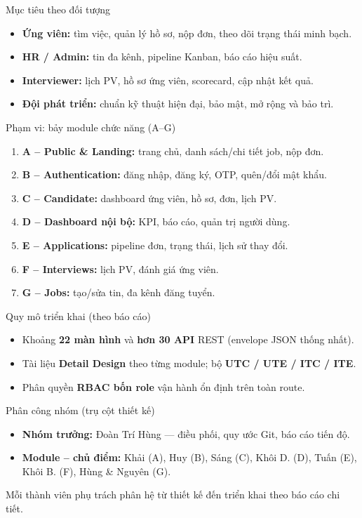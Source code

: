 \begin{frame}{Mục tiêu theo đối tượng}
  \small
  \begin{itemize}
    \item \textbf{Ứng viên:} tìm việc, quản lý hồ sơ, nộp đơn, theo dõi trạng thái minh bạch.
    \item \textbf{HR / Admin:} tin đa kênh, pipeline Kanban, báo cáo hiệu suất.
    \item \textbf{Interviewer:} lịch PV, hồ sơ ứng viên, scorecard, cập nhật kết quả.
    \item \textbf{Đội phát triển:} chuẩn kỹ thuật hiện đại, bảo mật, mở rộng và bảo trì.
  \end{itemize}
\end{frame}

\begin{frame}{Phạm vi: bảy module chức năng (A--G)}
  \footnotesize
  \begin{enumerate}
    \item \textbf{A -- Public \& Landing:} trang chủ, danh sách/chi tiết job, nộp đơn.
    \item \textbf{B -- Authentication:} đăng nhập, đăng ký, OTP, quên/đổi mật khẩu.
    \item \textbf{C -- Candidate:} dashboard ứng viên, hồ sơ, đơn, lịch PV.
    \item \textbf{D -- Dashboard nội bộ:} KPI, báo cáo, quản trị người dùng.
    \item \textbf{E -- Applications:} pipeline đơn, trạng thái, lịch sử thay đổi.
    \item \textbf{F -- Interviews:} lịch PV, đánh giá ứng viên.
    \item \textbf{G -- Jobs:} tạo/sửa tin, đa kênh đăng tuyển.
  \end{enumerate}
\end{frame}

\begin{frame}{Quy mô triển khai (theo báo cáo)}
  \begin{itemize}
    \item Khoảng \textbf{22 màn hình} và \textbf{hơn 30 API} REST (envelope JSON thống nhất).
    \item Tài liệu \textbf{Detail Design} theo từng module; bộ \textbf{UTC / UTE / ITC / ITE}.
    \item Phân quyền \textbf{RBAC bốn role} vận hành ổn định trên toàn route.
  \end{itemize}
\end{frame}

\begin{frame}{Phân công nhóm (trụ cột thiết kế)}
  \small
  \begin{itemize}
    \item \textbf{Nhóm trưởng:} Đoàn Trí Hùng --- điều phối, quy ước Git, báo cáo tiến độ.
    \item \textbf{Module -- chủ điểm:} Khải (A), Huy (B), Sáng (C), Khôi D. (D), Tuấn (E), Khôi B. (F), Hùng \& Nguyên (G).
  \end{itemize}
  \vspace{0.35cm}
  {\footnotesize Mỗi thành viên phụ trách phân hệ từ thiết kế đến triển khai theo báo cáo chi tiết.}
\end{frame}
